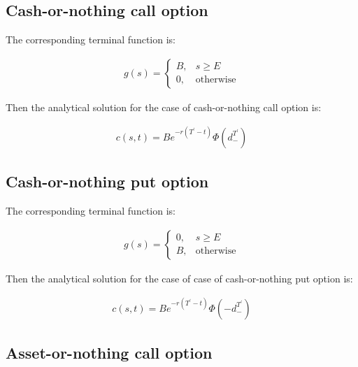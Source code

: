 \documentclass[11pt,a4paper]{extarticle}
\begin{document}
\subsection{Cash-or-nothing call option}

The corresponding terminal function is:

\begin{equation}
    \begin{aligned}
    g(s)=\begin{cases}B,&s\geq E \\ 0,&\text{otherwise}\end{cases}
    \end{aligned}
    \end{equation}

Then the analytical solution for the case of cash-or-nothing call option is:

\begin{equation}
    \begin{aligned}
    c(s,t) = Be^{-r(T^\prime-t)}\Phi(d_{-}^{T^\prime})
    \end{aligned}
    \end{equation}

\subsection{Cash-or-nothing put option}

The corresponding terminal function is:

\begin{equation}
    \begin{aligned}
    g(s)=\begin{cases}0,&s\geq E \\ B,&\text{otherwise}\end{cases}
    \end{aligned}
    \end{equation}

Then the analytical solution for the case of case of cash-or-nothing put option is:

\begin{equation}
    \begin{aligned}
    c(s,t) = Be^{-r(T^\prime-t)}\Phi(-d_{-}^{T^\prime})
    \end{aligned}
    \end{equation}

\subsection{Asset-or-nothing call option}
\end{document}
